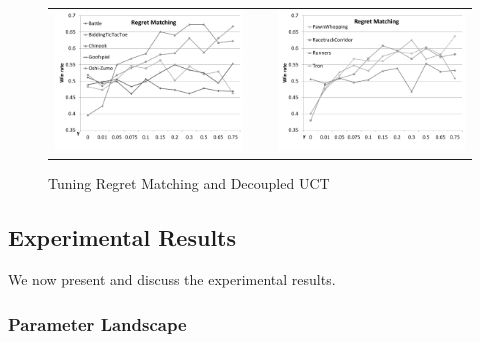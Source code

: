 \documentclass[conference]{IEEEtran}
\begin{document}
\begin{figure}[t!]
\begin{tabular}{ccc}
\includegraphics[scale=0.35]{figures/regretmatching1} & ~ & \includegraphics[scale=0.35]{figures/regretmatching2}\\
\end{tabular}
\caption{Tuning Regret Matching and Decoupled UCT}
\label{fig:tuning1}
\end{figure}


\subsection{Experimental Results}
\label{subsec:results}

We now present and discuss the experimental results. 

\subsubsection{Parameter Landscape}
\end{document}
